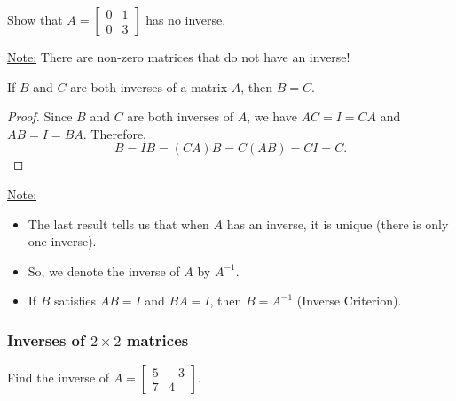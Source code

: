 \documentclass[20pt,a4paper]{extarticle}
\newcounter{example}
\newcounter{theorem}
\begin{document}
\begin{solution}

\end{solution}

\newpage 

\begin{example}
Show that $A = \begin{bmatrix} 0 & 1 \\ 0 & 3 \end{bmatrix}$ has no inverse.
\end{example}

\begin{solution}

\end{solution}

\vspace*{8cm}

\underline{Note:} There are non-zero matrices that do not have an inverse!

\vspace*{0.5cm}

\begin{theorem}
If $B$ and $C$ are both inverses of a matrix $A$, then $B = C$.
\end{theorem}

\begin{proof}
Since $B$ and $C$ are both inverses of $A$, we have $AC = I = CA$ and $AB = I = BA$. Therefore,
	\[
		B = IB = (CA) B = C (AB) = C I = C . \tag*{$\square$}
	\]
\end{proof}
\underline{Note:}
\begin{itemize}
	\item The last result tells us that when $A$ has an inverse, it is unique (there is only one inverse).
	\item So, we denote the inverse of $A$ by $A^{-1}$.
	\item If $B$ satisfies $AB = I$ and $BA = I$, then $B = A^{-1}$ (Inverse Criterion).
\end{itemize}

\newpage 

\subsubsection{Inverses of $2 \times 2$ matrices}

\begin{example}
Find the inverse of $A = \begin{bmatrix} 5 & -3 \\ 7 & 4 \end{bmatrix}$.
\end{example}
\end{document}

